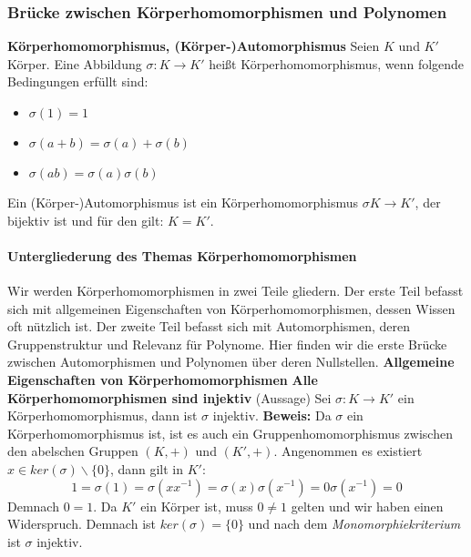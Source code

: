 \documentclass[a4paper, 10pt]{scrartcl}
\begin{document}
\subsubsection{Brücke zwischen Körperhomomorphismen und Polynomen}
\textbf{Körperhomomorphismus, (Körper-)Automorphismus}\newline
Seien $K$ und $K'$ Körper. Eine Abbildung $\sigma: K \rightarrow K'$ heißt Körperhomomorphismus, wenn folgende Bedingungen erfüllt sind:
\begin{itemize}
\item $\sigma (1) = 1$
\item $\sigma (a+b) = \sigma (a) + \sigma (b)$
\item $\sigma (ab) = \sigma (a) \sigma (b)$
\end{itemize}
Ein (Körper-)Automorphismus ist ein Körperhomomorphismus $\sigma K \rightarrow K'$, der bijektiv ist und für den gilt: $K = K'$.

\paragraph{Untergliederung des Themas Körperhomomorphismen}
Wir werden Körperhomomorphismen in zwei Teile gliedern. Der erste Teil befasst sich mit allgemeinen Eigenschaften von Körperhomomorphismen, dessen Wissen oft nützlich ist. Der zweite Teil befasst sich mit Automorphismen, deren Gruppenstruktur und Relevanz für Polynome. Hier finden wir die erste Brücke zwischen Automorphismen und Polynomen über deren Nullstellen.
\newline
\textbf{Allgemeine Eigenschaften von Körperhomomorphismen}\newline \newline 
\textbf{Alle Körperhomomorphismen sind injektiv} (Aussage)\newline
Sei $\sigma : K \rightarrow K'$ ein Körperhomomorphismus, dann ist $\sigma$ injektiv.\newline \newline
\textbf{Beweis:}\newline
Da $\sigma$ ein Körperhomomorphismus ist, ist es auch ein Gruppenhomomorphismus zwischen den abelschen Gruppen $(K,+)$ und $(K',+)$. Angenommen es existiert $x \in ker(\sigma) \backslash \{0\} $, dann gilt in $K'$: $$1 = \sigma(1) = \sigma (xx^{-1}) = \sigma(x) \sigma(x^{-1}) = 0 \sigma(x^{-1}) = 0$$
Demnach $0=1$. Da $K'$ ein Körper ist, muss $0 \neq 1$ gelten und wir haben einen Widerspruch.\newline
Demnach ist $ker(\sigma)=\{0\}$ und nach dem \textit{Monomorphiekriterium} ist $\sigma $ injektiv. \newline \newline
\end{document}
